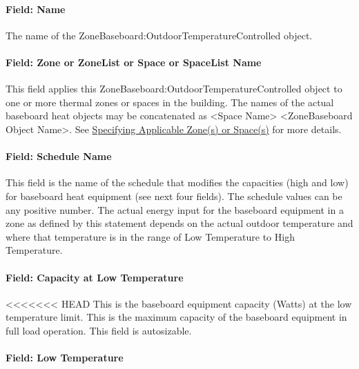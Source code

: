 \paragraph{Field: Name}\label{field-name-18-003}

The name of the ZoneBaseboard:OutdoorTemperatureControlled object.

\paragraph{Field: Zone or ZoneList or Space or SpaceList Name}\label{bbheat-field-zone-or-zonelist-name-000}

This field applies this ZoneBaseboard:OutdoorTemperatureControlled object to one or more thermal zones or spaces in the building. The names of the actual baseboard heat objects may be concatenated as \textless{}Space Name\textgreater{} \textless{}ZoneBaseboard Object Name\textgreater{}. See \hyperref[specifying-applicable-zones-or-spaces]{Specifying Applicable Zone(s) or Space(s)} for more details.

\paragraph{Field: Schedule Name}\label{field-schedule-name-11}

This field is the name of the schedule that modifies the capacities (high and low) for baseboard heat equipment (see next four fields). The schedule values can be any positive number. The actual energy input for the baseboard equipment in a zone as defined by this statement depends on the actual outdoor temperature and where that temperature is in the range of Low Temperature to High Temperature.

\paragraph{Field: Capacity at Low Temperature}\label{field-capacity-at-low-temperature}

<<<<<<< HEAD
This is the baseboard equipment capacity (Watts) at the low temperature limit. This is the maximum capacity of the baseboard equipment in full load operation. This field is autosizable.

\paragraph{Field: Low Temperature}\label{field-low-temperature}

